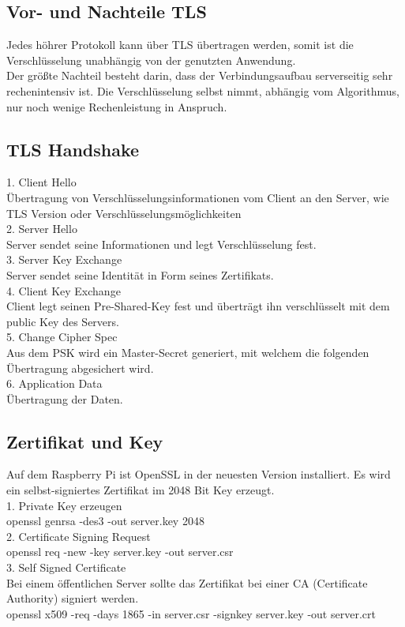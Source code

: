 \subsection{Vor- und Nachteile TLS}
Jedes höhrer Protokoll kann über TLS übertragen werden, somit ist die Verschlüsselung unabhängig von der genutzten Anwendung. \\
	Der größte Nachteil besteht darin, dass der Verbindungsaufbau serverseitig sehr rechenintensiv ist. Die Verschlüsselung selbst nimmt, abhängig vom Algorithmus, nur noch wenige Rechenleistung in Anspruch. \\

\subsection{TLS Handshake}
1. Client Hello\\
Übertragung von Verschlüsselungsinformationen vom Client an den Server, wie TLS Version oder Verschlüsselungsmöglichkeiten\\
2. Server Hello \\
Server sendet seine Informationen und legt Verschlüsselung fest. \\
3. Server Key Exchange\\
Server sendet seine Identität in Form seines Zertifikats. \\
4. Client Key Exchange\\
Client legt seinen Pre-Shared-Key fest und überträgt ihn verschlüsselt mit dem public Key des Servers.\\
5. Change Cipher Spec\\
Aus dem PSK wird ein Master-Secret generiert, mit welchem die folgenden Übertragung abgesichert wird. \\
6. Application Data\\
Übertragung der Daten. \\

\subsection{Zertifikat und Key}
Auf dem Raspberry Pi ist OpenSSL in der neuesten Version installiert. Es wird ein selbst-signiertes Zertifikat im 2048 Bit Key erzeugt.\\
1. Private Key erzeugen\\
openssl genrsa -des3 -out server.key 2048\\
2. Certificate Signing Request\\
openssl req -new -key server.key -out server.csr\\
3. Self Signed Certificate\\
Bei einem öffentlichen Server sollte das Zertifikat bei einer CA (Certificate Authority) signiert werden. \\
openssl x509 -req -days 1865 -in server.csr -signkey server.key -out server.crt

